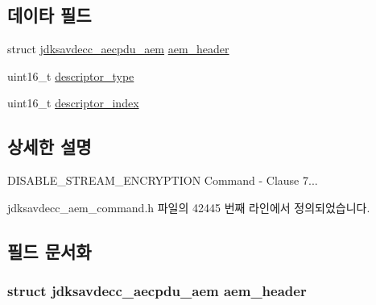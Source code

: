 \subsection*{데이타 필드}
\begin{DoxyCompactItemize}
\item 
struct \hyperlink{structjdksavdecc__aecpdu__aem}{jdksavdecc\+\_\+aecpdu\+\_\+aem} \hyperlink{structjdksavdecc__aem__command__disable__stream__encryption_ae1e77ccb75ff5021ad923221eab38294}{aem\+\_\+header}
\item 
uint16\+\_\+t \hyperlink{structjdksavdecc__aem__command__disable__stream__encryption_ab7c32b6c7131c13d4ea3b7ee2f09b78d}{descriptor\+\_\+type}
\item 
uint16\+\_\+t \hyperlink{structjdksavdecc__aem__command__disable__stream__encryption_a042bbc76d835b82d27c1932431ee38d4}{descriptor\+\_\+index}
\end{DoxyCompactItemize}


\subsection{상세한 설명}
D\+I\+S\+A\+B\+L\+E\+\_\+\+S\+T\+R\+E\+A\+M\+\_\+\+E\+N\+C\+R\+Y\+P\+T\+I\+ON Command -\/ Clause 7... 

jdksavdecc\+\_\+aem\+\_\+command.\+h 파일의 42445 번째 라인에서 정의되었습니다.



\subsection{필드 문서화}
\subsubsection[{\texorpdfstring{aem\+\_\+header}{aem_header}}]{\setlength{\rightskip}{0pt plus 5cm}struct {\bf jdksavdecc\+\_\+aecpdu\+\_\+aem} aem\+\_\+header}\hypertarget{structjdksavdecc__aem__command__disable__stream__encryption_ae1e77ccb75ff5021ad923221eab38294}{}\label{structjdksavdecc__aem__command__disable__stream__encryption_ae1e77ccb75ff5021ad923221eab38294}


